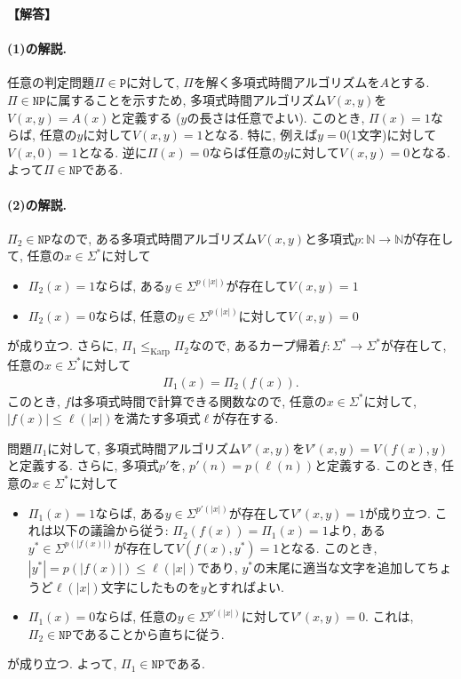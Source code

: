 \documentclass[12pt,a4paper]{article}
\newenvironment{solution}{
    \vspace{0.5em}
    \begin{tcolorbox}[colback=white, colframe=black, boxrule=1pt, arc=0mm, breakable]
    \noindent
    \textbf{【解答】}
    \vspace{0.3em}
}{
    \end{tcolorbox}
    \vspace{1em}
}
\begin{document}
\begin{solution}
\paragraph*{(1)の解説.}

任意の判定問題$\Pi\in\mathtt{P}$に対して, $\Pi$を解く多項式時間アルゴリズムを$A$とする. $\Pi\in\mathtt{NP}$に属することを示すため, 多項式時間アルゴリズム$V(x,y)$を$V(x,y)=A(x)$と定義する ($y$の長さは任意でよい).
このとき, $\Pi(x)=1$ならば, 任意の$y$に対して$V(x,y)=1$となる.
特に, 例えば$y=0$(1文字)に対して$V(x,0)=1$となる.
逆に$\Pi(x)=0$ならば任意の$y$に対して$V(x,y)=0$となる.
よって$\Pi\in\mathtt{NP}$である.

\paragraph*{(2)の解説.}
$\Pi_2\in\mathtt{NP}$なので, ある多項式時間アルゴリズム$V(x,y)$と多項式$p\colon\mathbb{N}\to\mathbb{N}$が存在して, 任意の$x\in\Sigma^*$に対して
\begin{itemize}
\item $\Pi_2(x)=1$ならば, ある$y\in\Sigma^{p(|x|)}$が存在して$V(x,y)=1$
\item $\Pi_2(x)=0$ならば, 任意の$y\in\Sigma^{p(|x|)}$に対して$V(x,y)=0$
\end{itemize}
が成り立つ.
さらに, $\Pi_1\le_{\mathrm{Karp}} \Pi_2$なので, あるカープ帰着$f\colon\Sigma^*\to\Sigma^*$が存在して, 任意の$x\in\Sigma^*$に対して
\begin{align*}
    \Pi_1(x) = \Pi_2(f(x)).
\end{align*}
このとき, $f$は多項式時間で計算できる関数なので, 任意の$x\in\Sigma^*$に対して, $|f(x)|\le \ell(|x|)$を満たす多項式$\ell$が存在する.

問題$\Pi_1$に対して, 多項式時間アルゴリズム$V'(x,y)$を$V'(x,y)=V(f(x),y)$と定義する. さらに, 多項式$p'$を, $p'(n) = p(\ell(n))$と定義する.
このとき, 任意の$x\in\Sigma^*$に対して
\begin{itemize}
\item $\Pi_1(x)=1$ならば, ある$y\in\Sigma^{p'(|x|)}$が存在して$V'(x,y)=1$が成り立つ. これは以下の議論から従う: $\Pi_2(f(x))=\Pi_1(x)=1$より, ある$y^*\in\Sigma^{p(|f(x)|)}$が存在して$V(f(x),y^*)=1$となる. このとき, $|y^*|=p(|f(x)|) \le \ell(|x|)$であり, $y^*$の末尾に適当な文字を追加してちょうど$\ell(|x|)$文字にしたものを$y$とすればよい.
\item $\Pi_1(x)=0$ならば, 任意の$y\in\Sigma^{p'(|x|)}$に対して$V'(x,y)=0$. これは, $\Pi_2\in\mathtt{NP}$であることから直ちに従う.
\end{itemize}
が成り立つ.
よって, $\Pi_1\in\mathtt{NP}$である.

\end{solution}
\end{document}
